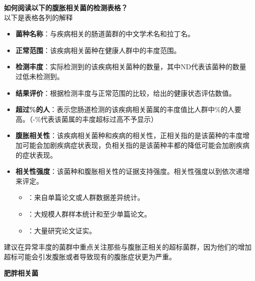 \documentclass[UTF8]{ctexart}
\begin{document}
\begin{tcolorbox}[
    enhanced,
    colback=lightpurple!10, %
    colframe=lightpurple!10,  %
    arc=3mm,
    boxrule=0.5pt,
    width=\textwidth,
    top=8pt,
    bottom=8pt
]
{\small{\color{lightpurple}\faQuestionCircle}\quad \textbf{如何阅读以下的腹胀相关菌的检测表格？}\\
{\color{orange!50}\faComments}\quad 以下是表格各列的解释
\begin{itemize}
    \item \textbf{菌种名称}：与疾病相关的肠道菌群的中文学术名和拉丁名。
    \item \textbf{正常范围}：该疾病相关菌种在健康人群中的丰度范围。
    \item \textbf{检测丰度}：实际检测到的该疾病相关菌种的数量，其中ND代表该菌种的数量过低未检测到。
    \item \textbf{结果评价}：根据检测丰度与正常范围的比较，给出的健康状态评估数值。
    \item \textbf{超过\%的人}：表示您肠道检测的该疾病相关菌属的丰度值比人群中\%的人要高。（-\%代表该菌属的丰度超标过高不予显示）
    \item \textbf{腹胀相关性}：该疾病相关菌种和疾病的相关性，正相关指的是该菌种的丰度增加可能会加剧疾病症状表现，负相关指的是该菌种丰都的降低可能会加剧疾病的症状表现。
    \item \textbf{相关性强度}：该菌种和腹胀相关性的证据支持强度。相关性强度以{\small\color{lightgray}\faStar}到{\small\color{lightgray}\faStar \faStar \faStar}依次递增来评定。
    \begin{itemize}
        \item \small{\color{lightgray}\faStar}：来自单篇论文或人群数据差异统计。
        \item \small{\color{lightgray}\faStar\faStar}：大规模人群样本统计和至少单篇论文。
        \item \small{\color{lightgray}\faStar\faStar\faStar}：大量研究论文证实。
    \end{itemize}
\end{itemize}
建议在异常丰度的菌群中重点关注那些与腹胀正相关的超标菌群，因为他们的增加超标可能会引发腹胀或者导致现有的腹胀症状更为严重。
}
\end{tcolorbox}



\newpage

\begin{tcolorbox}[
    enhanced,
    colback=white,
    colframe=white,
    arc=2mm,
    boxrule=0pt,
    width=\textwidth,
    left=15pt,
    right=15pt,
    top=10pt,
    bottom=10pt,
    drop shadow={
        opacity=0.2,
        color=customTeal
    },
    borderline west={5pt}{0pt}{customTeal}
]
\textcolor{customTeal}{\Large\textbf{肥胖相关菌}}
\end{tcolorbox}
\end{document}
